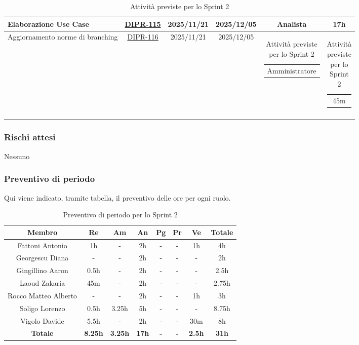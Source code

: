 \documentclass[a4paper,12pt]{article}
\begin{document}
\begin{spacing}{1}
\begin{longtable}{|p{4cm}|c|c|c|c|c|}
            \hline
            Elaborazione Use Case & \href{https://7zpus.atlassian.net/browse/DIPR-115}{DIPR-115} & 2025/11/21 & 2025/12/05 & Analista & 17h\\
            \hline
            Aggiornamento norme di branching & \href{https://7zpus.atlassian.net/browse/DIPR-116}{DIPR-116} & 2025/11/21 & 2025/12/05 & \begin{tabular}[c]{@{}c@{}} Amministratore \end{tabular} & \begin{tabular}[c]{@{}c@{}} 45m \end{tabular} \\ %
            \hline
    \caption{Attività previste per lo Sprint 2}

    \end{longtable}
    \end{spacing}


\subsubsection{Rischi attesi}
Nessuno

\subsubsection{Preventivo di periodo}
Qui viene indicato, tramite tabella, il preventivo delle ore per ogni ruolo.
\begin{table}[H]
    \begin{adjustwidth}{-4cm}{-4cm}
    \centering
    \begin{tabular}{|c|c|c|c|c|c|c|c|}
        \hline
        \textbf{Membro}& \textbf{Re} & \textbf{Am} & \textbf{An} & \textbf{Pg} & \textbf{Pr} & \textbf{Ve} & \textbf{Totale} \\
        \hline
        Fattoni Antonio & 1h & - & 2h & - & - & 1h & 4h\\
        \hline
        Georgescu Diana& - & - & 2h & - & - & - & 2h \\
        \hline
        Gingillino Aaron& 0.5h & - & 2h & - & - & - & 2.5h \\
        \hline
        Laoud Zakaria& 45m & - & 2h & - & - & - & 2.75h\\
        \hline
        Rocco Matteo Alberto & - & - & 2h & - & - & 1h & 3h\\
        \hline
        Soligo Lorenzo& 0.5h & 3.25h & 5h & - & - & - & 8.75h\\
        \hline
        Vigolo Davide & 5.5h & - & 2h & - & - & 30m & 8h \\
        \hline
        \textbf{Totale} & \textbf{8.25h}& \textbf{3.25h} & \textbf{17h}& \textbf{-}& \textbf{-}& \textbf{2.5h}& \textbf{31h}\\
        \hline
    \end{tabular}
    \caption{Preventivo di periodo per lo Sprint 2}
    \end{adjustwidth}
\end{table}
\end{document}
